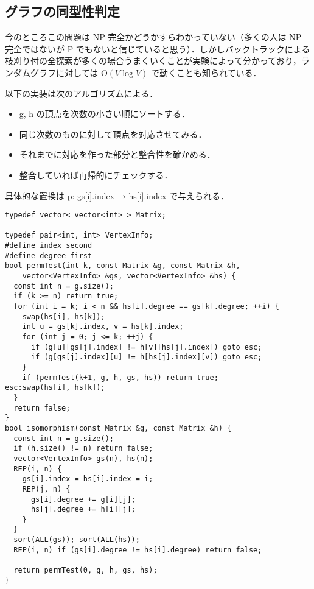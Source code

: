 \subsection{グラフの同型性判定}

今のところこの問題は NP 完全かどうかすらわかっていない（多くの人は NP 完全ではないが P でもないと信じていると思う）．しかしバックトラックによる枝刈り付の全探索が多くの場合うまくいくことが実験によって分かっており，ランダムグラフに対しては $\mathrm{O}(V \log V)$ で動くことも知られている．

以下の実装は次のアルゴリズムによる．

\begin{itemize}
\item{g, h の頂点を次数の小さい順にソートする．}
\item{同じ次数のものに対して頂点を対応させてみる．}
\item{それまでに対応を作った部分と整合性を確かめる．}
\item{整合していれば再帰的にチェックする．}
\end{itemize}

具体的な置換は p: gs[i].index → hs[i].index で与えられる．

\begin{lstlisting}
typedef vector< vector<int> > Matrix;

typedef pair<int, int> VertexInfo;
#define index second
#define degree first
bool permTest(int k, const Matrix &g, const Matrix &h,
    vector<VertexInfo> &gs, vector<VertexInfo> &hs) {
  const int n = g.size();
  if (k >= n) return true;
  for (int i = k; i < n && hs[i].degree == gs[k].degree; ++i) {
    swap(hs[i], hs[k]);
    int u = gs[k].index, v = hs[k].index;
    for (int j = 0; j <= k; ++j) {
      if (g[u][gs[j].index] != h[v][hs[j].index]) goto esc;
      if (g[gs[j].index][u] != h[hs[j].index][v]) goto esc;
    }
    if (permTest(k+1, g, h, gs, hs)) return true;
esc:swap(hs[i], hs[k]);
  }
  return false;
}
bool isomorphism(const Matrix &g, const Matrix &h) {
  const int n = g.size();
  if (h.size() != n) return false;
  vector<VertexInfo> gs(n), hs(n);
  REP(i, n) {
    gs[i].index = hs[i].index = i;
    REP(j, n) {
      gs[i].degree += g[i][j];
      hs[j].degree += h[i][j];
    }
  }
  sort(ALL(gs)); sort(ALL(hs));
  REP(i, n) if (gs[i].degree != hs[i].degree) return false;

  return permTest(0, g, h, gs, hs);
}
\end{lstlisting}



